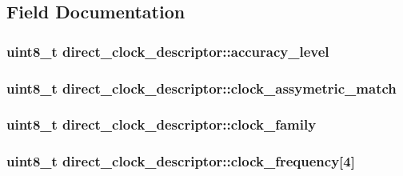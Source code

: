 \subsection{Field Documentation}
\hypertarget{structdirect__clock__descriptor_ad28b789865ad2c2eafa9984cb270e4a1}{
\subsubsection[{accuracy\-\_\-level}]{\setlength{\rightskip}{0pt plus 5cm}uint8\-\_\-t direct\-\_\-clock\-\_\-descriptor\-::accuracy\-\_\-level}}\label{structdirect__clock__descriptor_ad28b789865ad2c2eafa9984cb270e4a1}
\hypertarget{structdirect__clock__descriptor_a3be65c10fc6ac95897ad69f4e8811f68}{
\subsubsection[{clock\-\_\-assymetric\-\_\-match}]{\setlength{\rightskip}{0pt plus 5cm}uint8\-\_\-t direct\-\_\-clock\-\_\-descriptor\-::clock\-\_\-assymetric\-\_\-match}}\label{structdirect__clock__descriptor_a3be65c10fc6ac95897ad69f4e8811f68}
\hypertarget{structdirect__clock__descriptor_ab03f027327bef1534c1c6a8063bae273}{
\subsubsection[{clock\-\_\-family}]{\setlength{\rightskip}{0pt plus 5cm}uint8\-\_\-t direct\-\_\-clock\-\_\-descriptor\-::clock\-\_\-family}}\label{structdirect__clock__descriptor_ab03f027327bef1534c1c6a8063bae273}
\hypertarget{structdirect__clock__descriptor_a9a159e80c9d6ac47e9d1d037ff8c6bf3}{
\subsubsection[{clock\-\_\-frequency}]{\setlength{\rightskip}{0pt plus 5cm}uint8\-\_\-t direct\-\_\-clock\-\_\-descriptor\-::clock\-\_\-frequency\mbox{[}4\mbox{]}}}\label{structdirect__clock__descriptor_a9a159e80c9d6ac47e9d1d037ff8c6bf3}
